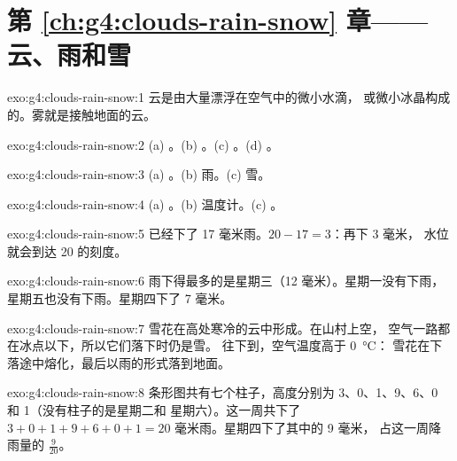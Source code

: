 \section*{第 \ref{ch:g4:clouds-rain-snow} 章——云、雨和雪}

\begin{solution}{exo:g4:clouds-rain-snow:1}
云是由大量漂浮在空气中的微小水滴，
或微小冰晶构成的。雾就是接触地面的云。
\end{solution}

\begin{solution}{exo:g4:clouds-rain-snow:2}
(a) 。(b) 。(c) 。(d) 。
\end{solution}

\begin{solution}{exo:g4:clouds-rain-snow:3}
(a) 。(b) 雨。(c) 雪。
\end{solution}

\begin{solution}{exo:g4:clouds-rain-snow:4}
(a) 。(b) 温度计。(c) 。
\end{solution}

\begin{solution}{exo:g4:clouds-rain-snow:5}
已经下了 17 毫米雨。$20 - 17 = 3$：再下 3 毫米，
水位就会到达 20 的刻度。
\end{solution}

\begin{solution}{exo:g4:clouds-rain-snow:6}
雨下得最多的是星期三（12 毫米）。星期一没有下雨，
星期五也没有下雨。星期四下了 7 毫米。
\end{solution}

\begin{solution}{exo:g4:clouds-rain-snow:7}
雪花在高处寒冷的云中形成。在山村上空，
空气一路都在冰点以下，所以它们落下时仍是雪。
往下到，空气温度高于 \SI{0}{\celsius}：
雪花在下落途中熔化，最后以雨的形式落到地面。
\end{solution}

\begin{solution}{exo:g4:clouds-rain-snow:8}
条形图共有七个柱子，高度分别为 3、0、1、9、6、0 和 1（没有柱子的是星期二和
星期六）。这一周共下了 $3 + 0 + 1 + 9 + 6 + 0 + 1 = 20$
毫米雨。星期四下了其中的 9 毫米，
占这一周降雨量的 $\frac{9}{20}$。
\end{solution}

